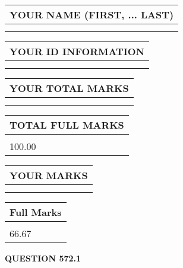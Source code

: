\documentclass{ctexart}
\begin{document}
   
   
   
\newpage 
\setcounter{page}{ 
   572001 } 
   
   
   
   
\noindent\begin{tabular}{|l|}
\hline
YOUR NAME (FIRST, ... LAST)  \\
\hline
 \\ 
 \\ 
\hline
\end{tabular}
\hspace{0.05in} \begin{tabular}{|l|}
\hline
 YOUR   ID   INFORMATION  \\
\hline
 \\ 
 \\ 
\hline
\end{tabular}
   
   
\vspace{0.2in}\noindent\begin{tabular}{|l|}
\hline
YOUR TOTAL MARKS  \\
\hline
 \\ 
 \\ 
\hline
\end{tabular}
\hspace{0.05in} \begin{tabular}{|l|}
\hline
TOTAL FULL MARKS  \\
\hline
 \\ 
100.00 \\
\hline
\end{tabular}
   
   
 \vspace{0.2in}
 
 
 
 
   
   
  
\vspace{0.2in}
  
\noindent\begin{tabular}{|l|}
\hline
 YOUR MARKS  \\
\hline
 \\ 
 \\ 
\hline
\end{tabular}
\hspace{0.05in} \begin{tabular}{|l|}
\hline
 Full Marks  \\
\hline
 \\ 
66.67 \\
\hline
\end{tabular}
{\textbf{\Large{QUESTION
572.1 
}}}
  
\end{document}
